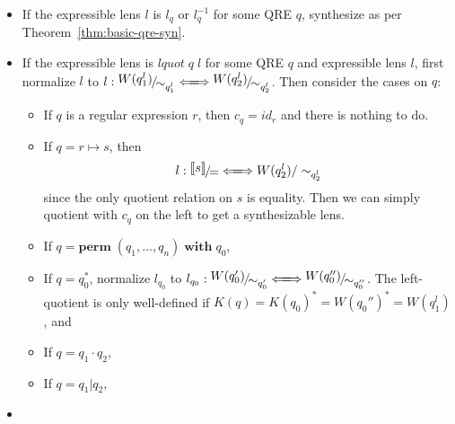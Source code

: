 \documentclass[a4paper,11pt] {article}
\theoremstyle{plain}
\newcommand{\lquot}{\textit{lquot}}
\newcommand{\lensbetween}[1]{\xLongleftrightarrow{#1}}
\newcommand{\perm}{ \textbf{perm}\; }
\newcommand{\with}{ \;\textbf{with}\; }
\newcommand{\niceFrac}[2]{%
    \raise.5ex\hbox{$#1$}%
    \kern-.1em/\kern-.15em%
    \lower.25ex\hbox{$#2$}}
\begin{document}
\begin{itemize}
\item If the expressible lens $l$ is $l_q$ or $l_q^{-1}$ for some QRE
  $q$, synthesize as per Theorem~\ref{thm:basic-qre-syn}.
\item If the expressible lens is $\lquot \; q \; l$ for some QRE $q$
  and expressible lens $l$, first normalize $l$
  to $l: \niceFrac{W(q_1^l)}{\sim_{q_1^l}} \lensbetween{}
  \niceFrac{W(q_2^l)}{\sim_{q_2^l}}$. Then consider the
  cases on $q$:
  \begin{itemize}
  \item If $q$ is a regular expression $r$, then
    $c_q = \mathit{id}_{r}$ and there is nothing to do.
  \item If $q = r \mapsto s$, then
    \begin{align*}
      l: \niceFrac{\llbracket s \rrbracket}{=} \lensbetween{}
      W(q_2^l)/\sim_{q_2^l}
    \end{align*}
    since the only quotient relation on $s$ is equality.
    Then we can simply quotient with $c_q$ on the left to get
    a synthesizable lens.
    
  \item If $q = \perm(q_1, \ldots, q_n) \with q_0$,
  \item If $q = q_0^*$,
    normalize $l_{q_0}$ to
    $l_{q_0}: \niceFrac{W(q_0')}{\sim_{q_0'}} \lensbetween{}
    \niceFrac{W(q_0'')}{\sim_{q_0''}}$. 
    The left-quotient is only well-defined if
    $K(q) = K(q_0)^* = W(q_0'')^* = W(q_1^l)$, and
    
  \item If $q = q_1 \cdot q_2$,
  \item If $q = q_1 | q_2$, 
  \end{itemize}
\item 
\end{itemize}
\end{document}
